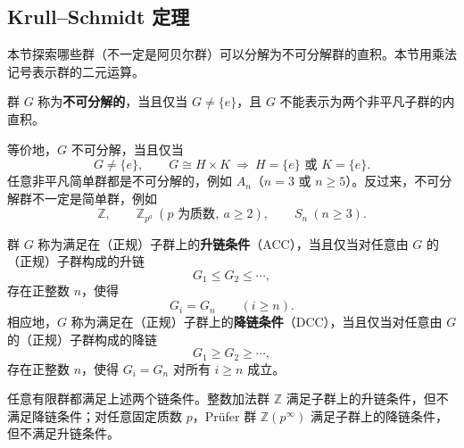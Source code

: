 \subsection{Krull--Schmidt 定理}\label{sec:krull-schmidt}


\begin{purplenote}
本节探索哪些群（不一定是阿贝尔群）可以分解为不可分解群的直积。本节用乘法记号表示群的二元运算。
\end{purplenote}

\begin{definition}[不可分解群]\label{def:indecomposable-group}
群 $G$ 称为\textbf{不可分解的}，当且仅当 $G\ne\{e\}$，且 $G$ 不能表示为两个非平凡子群的内直积。
\end{definition}

\begin{purplenote}
等价地，$G$ 不可分解，当且仅当
\[
  G\ne\{e\},\qquad
  G\cong H\times K\ \Longrightarrow\
  H=\{e\}\text{ 或 }K=\{e\}.
\]
任意非平凡简单群都是不可分解的，例如 $A_n$（$n=3$ 或 $n\geq5$）。反过来，不可分解群不一定是简单群，例如
\[
  \mathbb Z,\qquad
  \mathbb Z_{p^a}\ (p\text{ 为质数},\ a\geq2),\qquad
  S_n\ (n\geq3).
\]
\end{purplenote}

\begin{definition}[升链条件与降链条件]\label{def:group-chain-conditions}
群 $G$ 称为满足在（正规）子群上的\textbf{升链条件}（ACC），当且仅当对任意由 $G$ 的（正规）子群构成的升链
\[
  G_1\leq G_2\leq\cdots,
\]
存在正整数 $n$，使得
\[
  G_i=G_n\qquad(i\geq n).
\]
相应地，$G$ 称为满足在（正规）子群上的\textbf{降链条件}（DCC），当且仅当对任意由 $G$ 的（正规）子群构成的降链
\[
  G_1\geq G_2\geq\cdots,
\]
存在正整数 $n$，使得 $G_i=G_n$ 对所有 $i\geq n$ 成立。
\end{definition}

\begin{example}\label{ex:group-chain-conditions}
任意有限群都满足上述两个链条件。整数加法群 $\mathbb Z$ 满足子群上的升链条件，但不满足降链条件；对任意固定质数 $p$，Prüfer 群 $\mathbb Z(p^\infty)$ 满足子群上的降链条件，但不满足升链条件。
\end{example}

